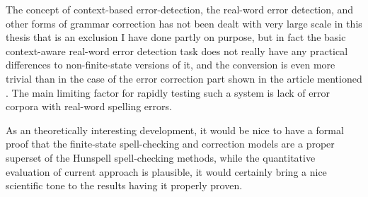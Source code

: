 \documentclass[officiallayout]{unihelcompling}
\begin{document}
The concept of context-based error-detection, the real-word error detection,
and other forms of grammar correction has not been dealt with very large scale
in this thesis that is an exclusion I have done partly on purpose, but in
fact the basic context-aware real-word error detection task does not really
have any practical differences to non-finite-state versions of it, and the
conversion is even more trivial than in the case of the error correction part
shown in the article mentioned . The main
limiting factor for rapidly testing such a system is lack of error corpora
with real-word spelling errors.

As an theoretically interesting development, it would be nice to have a formal
proof that the finite-state spell-checking and correction models are a proper
superset of the Hunspell spell-checking methods, while the quantitative
evaluation of current approach is plausible, it would certainly bring a nice
scientific tone to the results having it properly proven.



\end{document}
